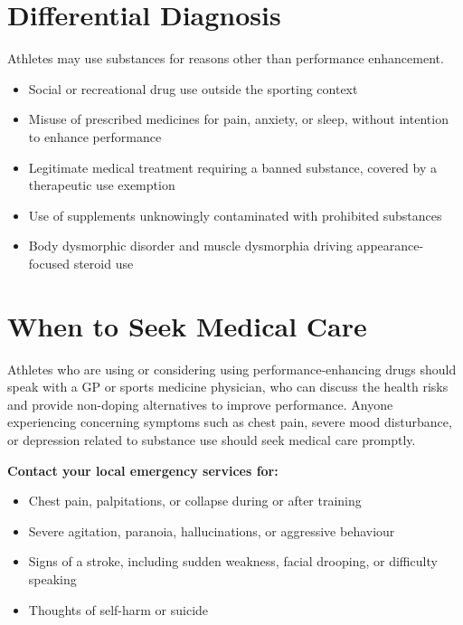 \section*{Differential Diagnosis}
Athletes may use substances for reasons other than performance enhancement.
\begin{itemize}
    \item Social or recreational drug use outside the sporting context
    \item Misuse of prescribed medicines for pain, anxiety, or sleep, without intention to enhance performance
    \item Legitimate medical treatment requiring a banned substance, covered by a therapeutic use exemption
    \item Use of supplements unknowingly contaminated with prohibited substances
    \item Body dysmorphic disorder and muscle dysmorphia driving appearance-focused steroid use
\end{itemize}

\section*{When to Seek Medical Care}
Athletes who are using or considering using performance-enhancing drugs should speak with a GP or sports medicine physician, who can discuss the health risks and provide non-doping alternatives to improve performance. Anyone experiencing concerning symptoms such as chest pain, severe mood disturbance, or depression related to substance use should seek medical care promptly.

\textbf{Contact your local emergency services for:}
\begin{itemize}
    \item Chest pain, palpitations, or collapse during or after training
    \item Severe agitation, paranoia, hallucinations, or aggressive behaviour
    \item Signs of a stroke, including sudden weakness, facial drooping, or difficulty speaking
    \item Thoughts of self-harm or suicide
\end{itemize}

